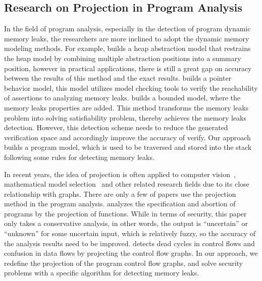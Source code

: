 \subsection{Research on Projection in Program Analysis}
In the field of program analysis, especially in the detection of program dynamic memory leaks, the researchers are more inclined to adopt the dynamic memory modeling methods. For example, \cite{KK16} builds a heap abstraction model that restrains the heap model by combining multiple abstraction positions into a summary position, however in practical applications, there is still a great gap on accuracy between the results of this method and the exact results. \cite{WJG14} builds a pointer behavior model, this model utilizes model checking tools to verify the reachability of assertions to analyzing memory leaks. \cite{MFS12} builds a bounded model, where the memory leaks properties are added. This method transforms the memory leaks problem into solving satisfiability problem, thereby achieves the memory leaks detection. However, this detection scheme needs to reduce the generated verification space and accordingly improve the accuracy of verify. Our approach builds a program model, which is used to be traversed and stored into the stack following some rules for detecting memory leaks.

In recent years, the idea of projection is often applied to computer vision~\cite{W05}, mathematical model selection~\cite{NL10} and other related research fields due to its close relationship with graphs. There are only a few of papers use the projection method in the program analysis. \cite{D94} analyzes the specification and abortion of programs by the projection of functions. While in terms of security, this paper only takes a conservative analysis, in other words, the output is ``uncertain” or ``unknown” for some uncertain input, which is relatively fuzzy, so the accuracy of the analysis results need to be improved. \cite{H87} detects dead cycles in control flows and confusion in data flows by projecting the control flow graphs. In our approach, we redefine the projection of the program control flow graphs, and solve security problems with a specific algorithm for detecting memory leaks.
